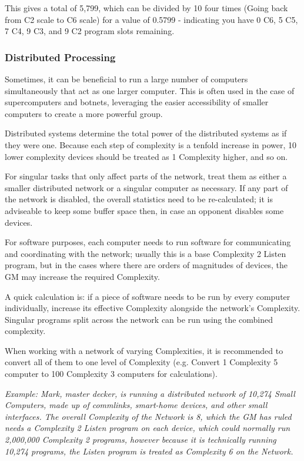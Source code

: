\begin{multicols}{3}
	This gives a total of 5,799, which can be divided by 10 four times (Going back from C2 scale to C6 scale) for a value of 0.5799 - indicating you have 0 C6, 5 C5, 7 C4, 9 C3, and 9 C2 program slots remaining.
	
	
	\subsubsection{Distributed Processing}
	
	Sometimes, it can be beneficial to run a large number of computers simultaneously that act as one larger computer. This is often used in the case of supercomputers and botnets, leveraging the easier accessibility of smaller computers to create a more powerful group.
	
	Distributed systems determine the total power of the distributed systems as if they were one. Because each step of complexity is a tenfold increase in power, 10 lower complexity devices should be treated as 1 Complexity higher, and so on. 
	
	For singular tasks that only affect parts of the network, treat them as either a smaller distributed network or a singular computer as necessary. If any part of the network is disabled, the overall statistics need to be re-calculated; it is adviseable to keep some buffer space then, in case an opponent disables some devices.
	
	For software purposes, each computer needs to run software for communicating and coordinating with the network; usually this is a base Complexity 2 Listen program, but in the cases where there are orders of magnitudes of devices, the GM may increase the required Complexity.
	
	A quick calculation is: if a piece of software needs to be run by every computer individually, increase its effective Complexity alongside the network's Complexity. Singular programs split across the network can be run using the combined complexity.
	
	When working with a network of varying Complexities, it is recommended to convert all of them to one level of Complexity (e.g. Convert 1 Complexity 5 computer to 100 Complexity 3 computers for calculations).
	
	\textit{\textcolor{OliveGreen}{Example: Mark, master decker, is running a distributed network of 10,274 Small Computers, made up of commlinks, smart-home devices, and other small interfaces. The overall Complexity of the Network is 8, which the GM has ruled needs a Complexity 2 Listen program on each device, which could normally run 2,000,000 Complexity 2 programs, however because it is technically running 10,274 programs, the Listen program is treated as Complexity 6 on the Network.}}
	

\end{multicols}
